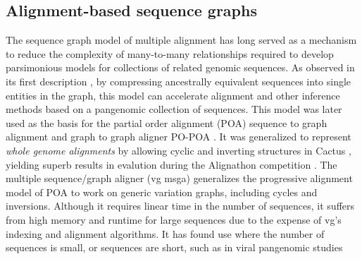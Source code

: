 \subsection{Alignment-based sequence graphs}

The sequence graph model of multiple alignment has long served as a mechanism to reduce the complexity of many-to-many relationships required to develop parsimonious models for collections of related genomic sequences.
As observed in its first description \cite{hein1989new}, by compressing ancestrally equivalent sequences into single entities in the graph, this model can accelerate alignment and other inference methods based on a pangenomic collection of sequences.
This model was later used as the basis for the partial order alignment (POA) sequence to graph alignment and graph to graph aligner PO-POA \cite{Lee_2002,Grasso_2004}.
It was generalized to represent \emph{whole genome alignments} by allowing cyclic and inverting structures in Cactus \cite{Paten_2011}, yielding superb results in evalution during the Alignathon competition \cite{earl2014alignathon}.
The multiple sequence/graph aligner (vg msga) \cite{Novak_2017a,Garrison_2018,Garrison_2019} generalizes the progressive alignment model of POA to work on generic variation graphs, including cycles and inversions.
Although it requires linear time in the number of sequences, it suffers from high memory and runtime for large sequences due to the expense of vg's indexing and alignment algorithms.
It has found use where the number of sequences is small, or sequences are short, such as in viral pangenomic studies \cite{Baaijens2019-ng}

